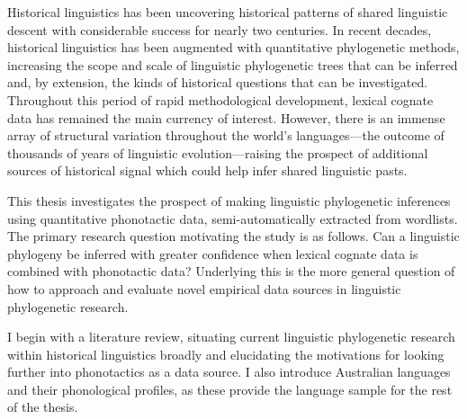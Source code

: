 

%

%




Historical linguistics has been uncovering historical patterns of shared linguistic descent with considerable success for nearly two centuries. In recent decades, historical linguistics has been augmented with quantitative phylogenetic methods, increasing the scope and scale of linguistic phylogenetic trees that can be inferred and, by extension, the kinds of historical questions that can be investigated. Throughout this period of rapid methodological development, lexical cognate data has remained the main currency of interest. However, there is an immense array of structural variation throughout the world's languages---the outcome of thousands of years of linguistic evolution---raising the prospect of additional sources of historical signal which could help infer shared linguistic pasts.

This thesis investigates the prospect of making linguistic phylogenetic inferences using quantitative phonotactic data, semi-automatically extracted from wordlists. The primary research question motivating the study is as follows. Can a linguistic phylogeny be inferred with greater confidence when lexical cognate data is combined with phonotactic data? Underlying this is the more general question of how to approach and evaluate novel empirical data sources in linguistic phylogenetic research.

I begin with a literature review, situating current linguistic phylogenetic research within historical linguistics broadly and elucidating the motivations for looking further into phonotactics as a data source. I also introduce Australian languages and their phonological profiles, as these provide the language sample for the rest of the thesis.

